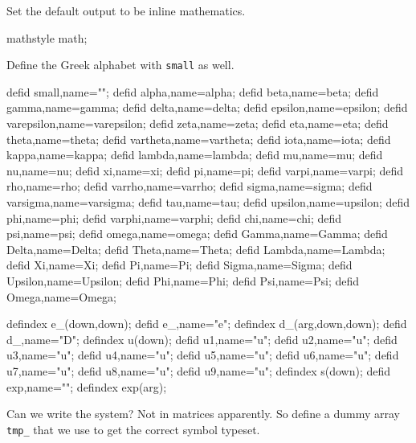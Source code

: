 \documentclass[11pt,a5paper]{article}
\def\eps{\varepsilon}
\begin{document}
Set the default output to be inline mathematics.
\begin{reduce}
mathstyle math;
\end{reduce}

Define the Greek alphabet with \verb|small| as well.
\begin{reduce}
defid small,name="\eps";%
defid alpha,name=alpha;
defid beta,name=beta;
defid gamma,name=gamma;
defid delta,name=delta;
defid epsilon,name=epsilon;
defid varepsilon,name=varepsilon;
defid zeta,name=zeta;
defid eta,name=eta;
defid theta,name=theta;
defid vartheta,name=vartheta;
defid iota,name=iota;
defid kappa,name=kappa;
defid lambda,name=lambda;
defid mu,name=mu;
defid nu,name=nu;
defid xi,name=xi;
defid pi,name=pi;
defid varpi,name=varpi;
defid rho,name=rho;
defid varrho,name=varrho;
defid sigma,name=sigma;
defid varsigma,name=varsigma;
defid tau,name=tau;
defid upsilon,name=upsilon;
defid phi,name=phi;
defid varphi,name=varphi;
defid chi,name=chi;
defid psi,name=psi;
defid omega,name=omega;
defid Gamma,name=Gamma;
defid Delta,name=Delta;
defid Theta,name=Theta;
defid Lambda,name=Lambda;
defid Xi,name=Xi;
defid Pi,name=Pi;
defid Sigma,name=Sigma;
defid Upsilon,name=Upsilon;
defid Phi,name=Phi;
defid Psi,name=Psi;
defid Omega,name=Omega;
\end{reduce}



\begin{reduce}
defindex e_(down,down);
defid e_,name="e";
defindex d_(arg,down,down);
defid d_,name="D";
defindex u(down);
defid u1,name="u"; 
defid u2,name="u"; 
defid u3,name="u"; 
defid u4,name="u"; 
defid u5,name="u"; 
defid u6,name="u"; 
defid u7,name="u"; 
defid u8,name="u"; 
defid u9,name="u"; 
defindex s(down);
defid exp,name="\exp";
defindex exp(arg);
\end{reduce}


Can we write the system? Not in matrices apparently. So
define a dummy array \verb|tmp_| that we use to get the
correct symbol typeset.
\end{document}
